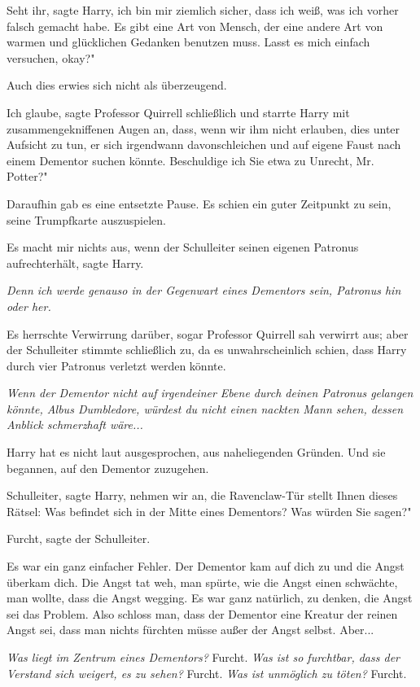 \glqq{}Seht ihr\grqq{}, sagte Harry, \glqq{}ich bin mir ziemlich sicher, dass ich
weiß, was ich vorher falsch gemacht habe. Es gibt eine Art von Mensch, der eine
andere Art von warmen und glücklichen Gedanken benutzen muss. Lasst es mich
einfach versuchen, okay?"

Auch dies erwies sich nicht als überzeugend.

\glqq{}Ich glaube\grqq{}, sagte Professor Quirrell schließlich und starrte Harry
mit zusammengekniffenen Augen an, \glqq{}dass, wenn wir ihm nicht erlauben, dies
unter Aufsicht zu tun, er sich irgendwann davonschleichen und auf eigene Faust
nach einem Dementor suchen könnte. Beschuldige ich Sie etwa zu Unrecht, Mr.
Potter?"

Daraufhin gab es eine entsetzte Pause. Es schien ein guter Zeitpunkt zu sein,
seine Trumpfkarte auszuspielen.

\glqq{}Es macht mir nichts aus, wenn der Schulleiter seinen eigenen Patronus
aufrechterhält\grqq{}, sagte Harry.

\emph{Denn ich werde genauso in der Gegenwart eines Dementors sein, Patronus
hin oder her.}

Es herrschte Verwirrung darüber, sogar Professor Quirrell sah verwirrt aus; aber
der Schulleiter stimmte schließlich zu, da es unwahrscheinlich schien, dass
Harry durch vier Patronus verletzt werden könnte.

\emph{Wenn der Dementor nicht auf irgendeiner Ebene durch deinen Patronus
gelangen könnte, Albus Dumbledore, würdest du nicht einen nackten Mann sehen,
dessen Anblick schmerzhaft wäre...}

Harry hat es nicht laut ausgesprochen, aus naheliegenden Gründen. Und sie
begannen, auf den Dementor zuzugehen.

\glqq{}Schulleiter\grqq{}, sagte Harry, \glqq{}nehmen wir an, die Ravenclaw-Tür
stellt Ihnen dieses Rätsel: Was befindet sich in der Mitte eines Dementors? Was
würden Sie sagen?"

\glqq{}Furcht\grqq{}, sagte der Schulleiter.

Es war ein ganz einfacher Fehler. Der Dementor kam auf dich zu und die Angst
überkam dich. Die Angst tat weh, man spürte, wie die Angst einen schwächte, man
wollte, dass die Angst wegging. Es war ganz natürlich, zu denken, die Angst sei
das Problem. Also schloss man, dass der Dementor eine Kreatur der reinen Angst
sei, dass man nichts fürchten müsse außer der Angst selbst. Aber...

\emph{Was liegt im Zentrum eines Dementors?}
Furcht.
\emph{Was ist so furchtbar, dass der Verstand sich weigert, es zu sehen?}
Furcht.
\emph{Was ist unmöglich zu töten?}
Furcht.

